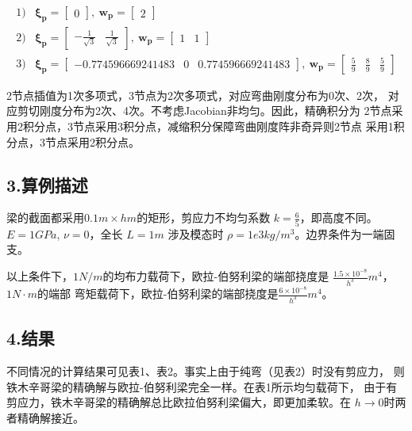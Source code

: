 \documentclass[UTF8,c5size]{ctexart}
\begin{document}
\begin{equation}
    \begin{split}
        1) & \bm{\xi_p}=\begin{bmatrix}
            0
        \end{bmatrix}, \ 
        \bm{w_p}=\begin{bmatrix}
            2
        \end{bmatrix}
        \\ 2) & \bm{\xi_p}=\begin{bmatrix}
            -\frac{1}{\sqrt{3}}&\frac{1}{\sqrt{3}}
        \end{bmatrix}, \ 
        \bm{w_p}=\begin{bmatrix}
            1&1
        \end{bmatrix}
        \\ 3) & \bm{\xi_p}=\begin{bmatrix}
            -0.774596669241483&0&0.774596669241483
        \end{bmatrix}, \ 
        \bm{w_p}=\begin{bmatrix}
            \frac{5}{9}&\frac{8}{9}&\frac{5}{9}
        \end{bmatrix}
    \end{split}
\end{equation}

2节点插值为1次多项式，3节点为2次多项式，对应弯曲刚度分布为0次、2次，
对应剪切刚度分布为2次、4次。不考虑Jacobian非均匀。因此，精确积分为
2节点采用2积分点，3节点采用3积分点，减缩积分保障弯曲刚度阵非奇异则2节点
采用1积分点，3节点采用2积分点。

\subsection*{3.算例描述}

梁的截面都采用$0.1m\times hm$的矩形，剪应力不均匀系数
$k=\frac{6}{5}$，即高度不同。$E=1GPa$, $\nu = 0$，全长
$L=1m$
涉及模态时
$\rho=1e3kg/m^3$。边界条件为一端固支。

以上条件下，$1N/m$的均布力载荷下，欧拉-伯努利梁的端部挠度是
$\frac{1.5\times10^{-8}}{h^3}m^4$，$1N\cdot m$的端部
弯矩载荷下，欧拉-伯努利梁的端部挠度是$\frac{6\times10^{-8}}{h^3}m^4$。

\subsection*{4.结果}

不同情况的计算结果可见表1、表2。事实上由于纯弯（见表2）时没有剪应力，
则铁木辛哥梁的精确解与欧拉-伯努利梁完全一样。在表1所示均匀载荷下，
由于有剪应力，铁木辛哥梁的精确解总比欧拉伯努利梁偏大，即更加柔软。在
$h\rightarrow 0$时两者精确解接近。
\end{document}
